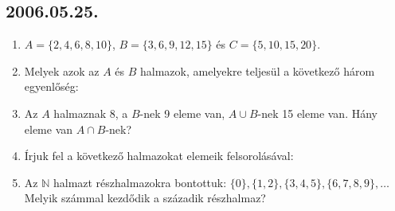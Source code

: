 \subsection*{2006.05.25.}
\begin{enumerate}
\item $A=\{2,4,6,8,10\}$, $B=\{3,6,9,12,15\}$ és $C=\{5,10,15,20\}$.
\item Melyek azok az $A$ és $B$ halmazok, amelyekre teljesül a következő három egyenlőség:
\item Az $A$ halmaznak 8, a $B$-nek 9 eleme van, $A\cup B$-nek 15 eleme van. Hány eleme van $A\cap B$-nek?
\item Írjuk fel a következő halmazokat elemeik felsorolásával:
\item Az $\mathbb{N}$ halmazt részhalmazokra bontottuk:
$\{0\}, \{1,2\}, \{3,4,5\}, \{6,7,8,9\}, \ldots$
Melyik számmal kezdődik a századik részhalmaz?
\end{enumerate}

